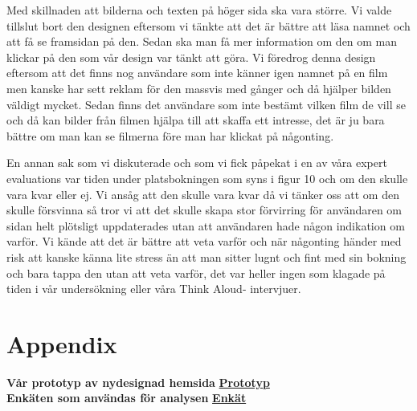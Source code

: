 \documentclass[swedish,a4paper,11pt]{article}
\begin{document}
Med skillnaden att bilderna och texten på höger sida ska vara större. Vi valde tillslut bort den designen eftersom vi tänkte att det är bättre att läsa namnet och att få se framsidan på den. Sedan ska man få mer information om den om man klickar på den som vår design var tänkt att göra. Vi föredrog denna design eftersom att det finns nog användare som inte känner igen namnet på en film men kanske har sett reklam för den massvis med gånger och då hjälper bilden väldigt mycket. Sedan finns det användare som inte bestämt vilken film de vill se och då kan bilder från filmen hjälpa till att skaffa ett intresse, det är ju bara bättre om man kan se filmerna före man har klickat på någonting.

En annan sak som vi diskuterade och som vi fick påpekat i en av våra expert evaluations var tiden under platsbokningen som syns i figur 10 och om den skulle vara kvar eller ej. Vi ansåg att den skulle vara kvar då vi tänker oss att om den skulle försvinna så tror vi att det skulle skapa stor förvirring för användaren om sidan helt plötsligt uppdaterades utan att användaren hade någon indikation om varför. Vi kände att det är bättre att veta varför och när någonting händer med risk att kanske känna lite stress än att man sitter lugnt och fint med sin bokning och bara tappa den utan att veta varför, det var heller ingen som klagade på tiden i vår undersökning eller våra Think Aloud- intervjuer.


\newpage
\section{Appendix}

\textbf{Vår prototyp av nydesignad hemsida} \hfill \textbf{\href{http://user.it.uu.se/~mise2899/home.html}{Prototyp}}\\
\textbf{Enkäten som användas för analysen} \hfill \textbf{\href{https://docs.google.com/forms/d/1KFDziZeg0wwAXTIV-LeV9eBy-Oa-SH1aR7GebkXLKKI/viewform?c=0&w=1}{Enkät}}
\end{document}
